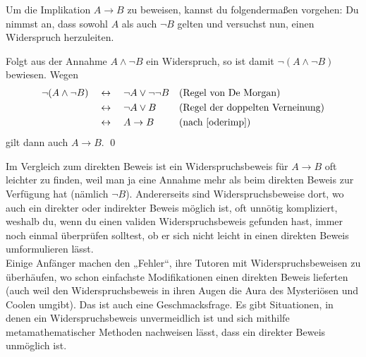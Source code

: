  
 
 
 
 
 
 \begin{sat}
  Um die Implikation $A\to B$ zu beweisen, kannst du folgendermaßen vorgehen: Du nimmst an, dass sowohl $A$ als auch $\neg B$ gelten und versuchst nun, einen Widerspruch herzuleiten.
 \end{sat}
\begin{bew}
 Folgt aus der Annahme $A\land \neg B$ ein Widerspruch, so ist damit $\neg(A\land \neg B)$ bewiesen. Wegen
 \begin{align*}
  \neg (A\land \neg B) \quad&\leftrightarrow\quad \neg A\lor \neg\neg B && (\text{Regel von De Morgan}) \\
  &\leftrightarrow\quad \neg A\lor B && (\text{Regel der doppelten Verneinung}) \\
  & \leftrightarrow\quad A\to B && (\text{nach \cref{oderimp}})
 \end{align*}
gilt dann auch $A\to B$. \qed
\end{bew}

 
 
  
  \begin{bem}
Im Vergleich zum direkten Beweis ist ein Widerspruchsbeweis für $A\to B$ oft leichter zu finden, weil man ja eine Annahme mehr als beim direkten Beweis zur Verfügung hat (nämlich $\neg B$). Andererseits sind Widerspruchsbeweise dort, wo auch ein direkter oder indirekter Beweis möglich ist, oft unnötig kompliziert, weshalb du, wenn du einen validen Widerspruchsbeweis gefunden hast, immer noch einmal überprüfen solltest, ob er sich nicht leicht in einen direkten Beweis umformulieren lässt. \\
 Einige Anfänger machen den „Fehler“, ihre Tutoren mit Widerspruchsbeweisen zu überhäufen, wo schon einfachste Modifikationen einen direkten Beweis lieferten (auch weil den Widerspruchsbeweis in ihren Augen die Aura des Mysteriösen und Coolen umgibt). Das ist auch eine Geschmacksfrage. Es gibt Situationen, in denen ein Widerspruchsbeweis unvermeidlich ist und sich mithilfe metamathematischer Methoden nachweisen lässt, dass ein direkter Beweis unmöglich ist.
  \end{bem}
  
